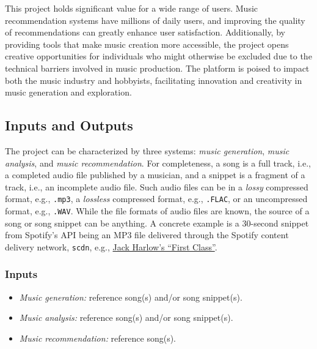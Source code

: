 \documentclass{article}
\begin{document}
This project holds significant value for a wide range of users. Music recommendation systems have millions of daily users, and improving the quality of recommendations can greatly enhance user satisfaction. Additionally, by providing tools that make music creation more accessible, the project opens creative opportunities for individuals who might otherwise be excluded due to the technical barriers involved in music production. The platform is poised to impact both the music industry and hobbyists, facilitating innovation and creativity in music generation and exploration.

\subsection{Inputs and Outputs}

The project can be characterized by three systems: \emph{music generation}, \emph{music analysis}, and \emph{music recommendation}. For completeness, a song is a full track, i.e., a completed audio file published by a musician, and a snippet is a fragment of a track, i.e., an incomplete audio file. Such audio files can be in a \emph{lossy} compressed format, e.g., \texttt{.mp3}, a \emph{lossless} compressed format, e.g., \texttt{.FLAC}, or an uncompressed format, e.g., \texttt{.WAV}. While the file formats of audio files are known, the source of a song or song snippet can be anything. A concrete example is a 30-second snippet from Spotify's API being an MP3 file delivered through the Spotify content delivery network, \texttt{scdn}, e.g., \href{https://p.scdn.co/mp3-preview/c05a687254dbdf50a9ab4879d85e54a7594e367f?cid=945b9ed74f4c43b49bcf26e7dc388df0}{Jack Harlow's ``First Class''}.


\subsubsection{Inputs}

\begin{itemize}
    \item \emph{Music generation:} reference song(s) and/or song snippet(s).
    \item \emph{Music analysis:} reference song(s) and/or song snippet(s).
    \item \emph{Music recommendation:} reference song(s).
\end{itemize}
\end{document}
